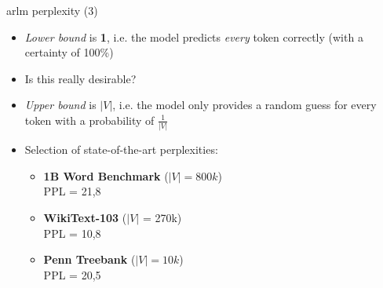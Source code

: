 \begin{frame}{arlm perplexity (3)}

\vfill

\begin{itemize}
	\item \textit{Lower bound} is \textbf{1}, i.e. the model predicts \textit{every} token correctly (with a certainty of 100\%)
	\item \ques Is this really desirable?
	\item \textit{Upper bound} is $|V|$, i.e. the model only provides a random guess for every token with a probability of $\frac{1}{|V|}$
	\item Selection of state-of-the-art perplexities:
			\begin{itemize}
				\item \textbf{1B Word Benchmark}  ($|V| = 800k$)\\
				PPL = 21,8 
				\item \textbf{WikiText-103}  ($|V|$ = 270k)\\
				PPL = 10,8 
				\item \textbf{Penn Treebank}  ($|V| = 10k$)\\
				PPL = 20,5 
			\end{itemize}
\end{itemize}

\vfill

\end{frame}


